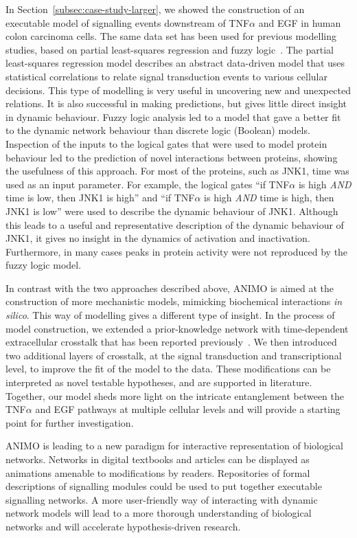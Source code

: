 In Section~\ref{subsec:case-study-larger}, we showed the construction of an executable model
of signalling events downstream of
TNF$\alpha$ and EGF in human colon carcinoma cells. The same data set has been used for
previous modelling studies, based on partial least-squares regression and fuzzy logic~\citep{pathway-leastsquare,pathway-fuzzy}.
The partial least-squares regression model describes an abstract data-driven model that uses statistical correlations
to relate signal transduction events to various cellular decisions. This type of modelling is
very useful in uncovering new and unexpected relations. It is also successful in making
predictions, but gives little direct insight in dynamic behaviour. Fuzzy
logic analysis led to a model that gave a better fit to the dynamic network behaviour than
discrete logic (Boolean) models. Inspection of the inputs to the logical gates that were used
to model protein behaviour led to the prediction of novel interactions between proteins,
showing the usefulness of this approach. For most of the proteins, such as JNK1, time was
used as an input parameter. For example, the logical gates ``if TNF$\alpha$ is high
\emph{AND} time is low, then JNK1 is high'' and ``if TNF$\alpha$ is high \emph{AND} time is
high, then JNK1 is low'' were used to
describe the dynamic behaviour of JNK1. Although this leads to a useful and representative
description of the dynamic behaviour of JNK1, it gives no insight in the dynamics
of activation and inactivation. Furthermore, in many cases peaks in protein activity were
not reproduced by the fuzzy logic model.

In contrast with the two approaches described above, ANIMO is aimed at the construction of
more mechanistic models, mimicking biochemical interactions \emph{in silico}. This way of modelling
gives a different type of insight. In the process of model construction, we extended a
prior-knowledge network with time-dependent extracellular crosstalk that has been reported
previously~\citep{pathway-autocrine}. We then introduced two additional layers of
crosstalk, at the signal transduction and transcriptional level, to
improve the fit of the model to the data. These modifications can be interpreted as novel testable hypotheses,
and are supported in literature.
Together, our model sheds more light on the intricate
entanglement between the TNF$\alpha$ and EGF pathways at multiple cellular levels and will
provide a starting point for further investigation.

ANIMO is leading to a new paradigm for interactive
representation of biological networks. Networks in digital textbooks and articles can be
displayed as animations amenable to modifications by readers. Repositories of formal
descriptions of signalling modules could be used to put together executable signalling
networks. A more user-friendly way of interacting with dynamic network models will lead to a
more thorough understanding of biological networks and will accelerate hypothesis-driven
research.
